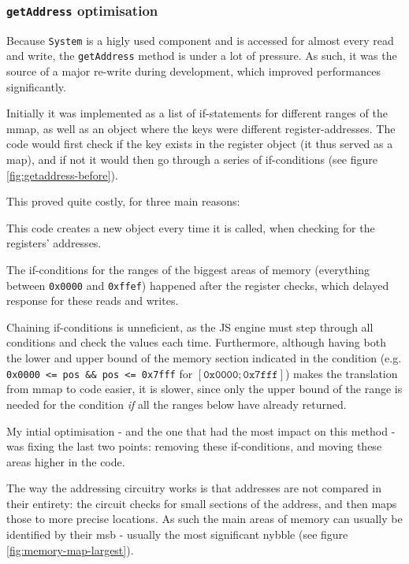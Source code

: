\documentclass[11pt]{report}
\begin{document}
\subsubsection{\texttt{getAddress} optimisation}

Because \texttt{System} is a higly used component and is accessed for almost every read and write, the \texttt{getAddress} method is under a lot of pressure. As such, it was the source of a major re-write during development, which improved performances significantly.

Initially it was implemented as a list of if-statements for different ranges of the \gls{mmap}, as well as an object where the keys were different register-addresses. The code would first check if the key exists in the register object (it thus served as a map), and if not it would then go through a series of if-conditions (see figure \ref{fig:getaddress-before}).

This proved quite costly, for three main reasons:
\begin{compactitem}
    \item This code creates a new object every time it is called, when checking for the registers' addresses.
    \item The if-conditions for the ranges of the biggest areas of memory (everything between \texttt{0x0000} and \texttt{0xffef}) happened after the register checks, which delayed response for these reads and writes.
    \item Chaining if-conditions is unneficient, as the JS engine must step through all conditions and check the values each time. Furthermore, although having both the lower and upper bound of the memory section indicated in the condition (e.g. \texttt{0x0000 <= pos \&\& pos <= 0x7fff} for $[\texttt{0x0000}; \texttt{0x7fff}]$) makes the translation from \gls{mmap} to code easier, it is slower, since only the upper bound of the range is needed for the condition \textit{if} all the ranges below have already returned.
\end{compactitem}

My intial optimisation - and the one that had the most impact on this method - was fixing the last two points: removing these if-conditions, and moving these areas higher in the code.

The way the addressing circuitry works is that addresses are not compared in their entirety: the circuit checks for small sections of the address, and then maps those to more precise locations. As such the main areas of memory can usually be identified by their \gls{msb} - usually the most significant nybble (see figure \ref{fig:memory-map-largest}).
\end{document}
